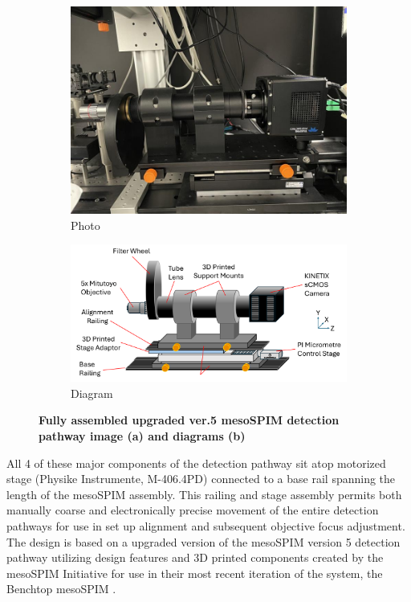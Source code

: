 \begin{figure}[H]
    \centering
    \begin{subfigure}[a]{1\textwidth}
    \centering
    \includegraphics[width=0.75\linewidth]{Images/DetectionPathPhoto.jpg}
    \caption{Photo}
    \end{subfigure}
    \medskip
   
    \begin{subfigure}[b]{1\textwidth}
    \centering
    \includegraphics[width=1\linewidth]{Figures/Detection Diagram.png}
    \caption{Diagram}
    \end{subfigure}
    \caption{\textbf{Fully assembled upgraded ver.5 mesoSPIM detection pathway image (a) and diagrams (b)}}
    \label{fig:enter-label}
\end{figure}


All 4 of these major components of the detection pathway sit atop motorized stage (Physike Instrumente, M-406.4PD) connected to a base rail spanning the length of the mesoSPIM assembly. This railing and stage assembly permits both manually coarse and electronically precise movement of the entire detection pathways for use in set up alignment and subsequent objective focus adjustment. The design is based on a upgraded version of the mesoSPIM version 5 detection pathway utilizing design features and 3D printed components created by the mesoSPIM Initiative for use in their most recent iteration of the system, the Benchtop mesoSPIM \cite{vladimirov_benchtop_2024}.

